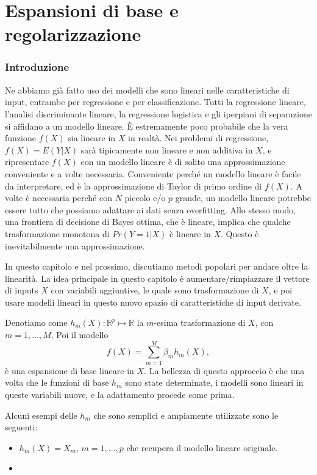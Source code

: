 \documentclass[11pt,openany]{book}
\begin{document}
\tableofcontents

\chapter{Espansioni di base e regolarizzazione}

\subsection{Introduzione}

Ne abbiamo già fatto uso dei modelli che sono lineari nelle caratteristiche di input, entrambe per regressione e per classificazione. Tutti la regressione lineare, l'analisi discriminante lineare, la regressione logistica e gli iperpiani di separazione si affidano a un modello lineare. È estremamente poco probabile che la vera funzione $f(X)$ sia lineare in $X$ in realtà. Nei problemi di regressione, $f(X) = E(Y | X)$ sarà tipicamente non lineare e non additiva in $X$, e ripresentare $f(X)$ con un modello lineare è di solito una approssimazione conveniente e a volte necessaria. Conveniente perché un modello lineare è facile da interpretare, ed è la approssimazione di Taylor di primo ordine di $f(X)$. A volte è necessaria perché con $N$ piccolo e/o $p$ grande, un modello lineare potrebbe essere tutto che possiamo adattare ai dati senza overfitting. Allo stesso modo, una frontiera di decisione di Bayes ottima, che è lineare, implica che qualche trasformazione monotona di $Pr(Y = 1 | X)$ è lineare in $X$. Questo è inevitabilmente una approssimazione.

In questo capitolo e nel prossimo, discutiamo metodi popolari per andare oltre la linearità. La idea principale in questo capitolo è aumentare/rimpiazzare il vettore di inputs $X$ con variabili aggiuntive, le quale sono trasformazione di $X$, e poi usare modelli lineari in questo nuovo spazio di caratteristiche di input derivate.

Denotiamo come $h_m(X) : \mathbb{R}^p \mapsto \mathbb{R}$ la $m$-esima trasformazione di $X$, con $m = 1, \dots, M$. Poi il modello
\begin{equation}
\label{eq5-1}
f(X) = \sum_{m = 1}^{M}{\beta_m h_m (X)},
\end{equation}
è una espansione di base lineare in $X$. La bellezza di questo approccio è che una volta che le funzioni di base $h_m$ sono state determinate, i modelli sono lineari in queste variabili nuove, e la adattamento procede come prima.

Alcuni esempi delle $h_m$ che sono semplici e ampiamente utilizzate sono le seguenti:
\begin{itemize}
\item $h_m(X) = X_m$, $m = 1, \dots, p$ che recupera il modello lineare originale.

\item 
\end{itemize}
\end{document}
